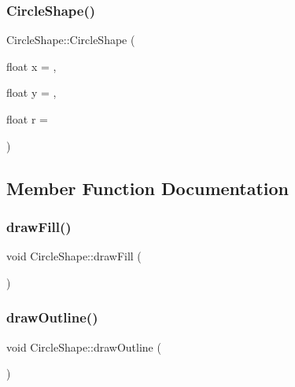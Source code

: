 \subsubsection{\texorpdfstring{Circle\+Shape()}{CircleShape()}}
{\footnotesize\ttfamily Circle\+Shape\+::\+Circle\+Shape (\begin{DoxyParamCaption}\item[{float}]{x = {},  }\item[{float}]{y = {},  }\item[{float}]{r = {} }\end{DoxyParamCaption})}



\subsection{Member Function Documentation}
\hypertarget{class_circle_shape_a4bdbdab71c47dd560ba58b4d21659be1}{}\label{class_circle_shape_a4bdbdab71c47dd560ba58b4d21659be1} 
\subsubsection{\texorpdfstring{draw\+Fill()}{drawFill()}}
{\footnotesize\ttfamily void Circle\+Shape\+::draw\+Fill (\begin{DoxyParamCaption}{ }\end{DoxyParamCaption})}

\hypertarget{class_circle_shape_a42fe963aa4872668748f0ba882f49878}{}\label{class_circle_shape_a42fe963aa4872668748f0ba882f49878} 
\subsubsection{\texorpdfstring{draw\+Outline()}{drawOutline()}}
{\footnotesize\ttfamily void Circle\+Shape\+::draw\+Outline (\begin{DoxyParamCaption}{ }\end{DoxyParamCaption})}

\hypertarget{class_circle_shape_a931eb9fffe6985d45717bf8175960503}{}\label{class_circle_shape_a931eb9fffe6985d45717bf8175960503} 
